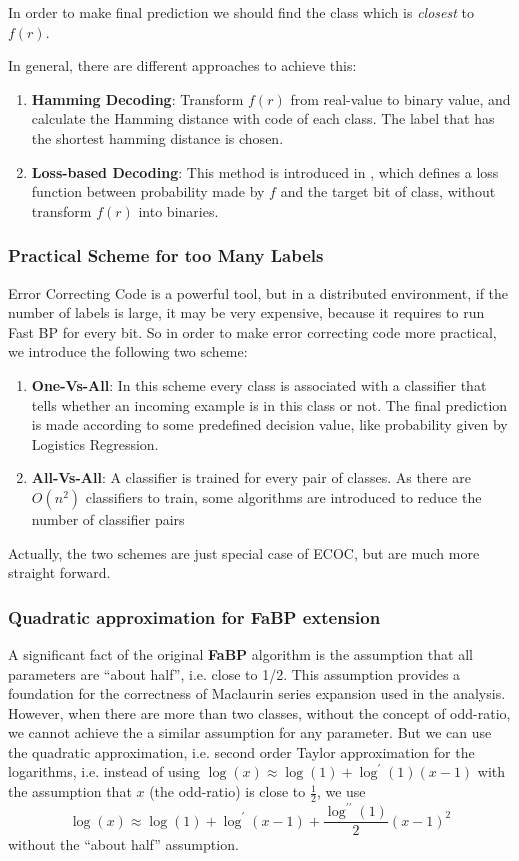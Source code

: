 In order to make final prediction we should find the class which is \textit{closest} to $f(r)$.

In general, there are different approaches to achieve this:

\begin{enumerate}
	\item \textbf{Hamming Decoding}: Transform $f(r)$ from real-value to binary value, and calculate the Hamming distance with code of each class. The label that has the shortest hamming distance is chosen.
	\item \textbf{Loss-based Decoding}: This method is introduced in \cite{Erin2000}, which defines a loss function between probability made by $f$ and the target bit of class, without transform $f(r)$ into binaries.
\end{enumerate}

\subsubsection*{Practical Scheme for too Many Labels}

Error Correcting Code is a powerful tool, but in a distributed environment, if the number of labels is large, it may be very expensive, because it requires to run Fast BP for every bit. So in order to make error correcting code more practical, we introduce the following two scheme:

\begin{enumerate}
	\item \textbf{One-Vs-All}: In this scheme every class is associated with a classifier that tells whether an incoming example is in this class or not. The final prediction is made according to some predefined decision value, like probability given by Logistics Regression.
	\item \textbf{All-Vs-All}: A classifier is trained for every pair of classes. As there are $O(n^{2})$ classifiers to train, some algorithms are introduced to reduce the number of classifier pairs\cite{Platt2000}
\end{enumerate}

Actually, the two schemes are just special case of ECOC, but are much more straight forward.

\subsubsection{Quadratic approximation for FaBP extension}
A significant fact of the original \textbf{FaBP} algorithm is the assumption that all parameters are ``about half'', i.e. close to 1/2. This assumption provides a foundation for the correctness of Maclaurin series expansion used in the analysis. However, when there are more than two classes, without the concept of odd-ratio, we cannot achieve the a similar assumption for any parameter. But we can use the quadratic approximation, i.e. second order Taylor approximation for the logarithms, i.e. instead of using $\log(x) \approx \log(1)+\log^{\prime}(1)(x-1)$ with the assumption that $x$ (the odd-ratio) is close to $\frac{1}{2}$, we use
$$\log(x)\approx \log(1)+\log^{\prime}(x-1)+\frac{\log^{\prime\prime}(1)}{2}(x-1)^2$$
without the ``about half'' assumption.

